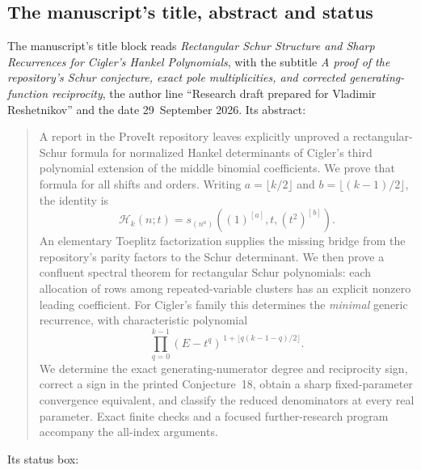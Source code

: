 \documentclass[11pt]{article}
\theoremstyle{definition}
\theoremstyle{remark}
\newcommand{\Ht}{\mathcal H}
\newcommand{\rep}[2]{(#1)^{[#2]}}
\theoremstyle{definition}
\theoremstyle{plain}
\numberwithin{equation}{section}
\begin{document}
\subsection{The manuscript's title, abstract and status}
\label{rs:sec:front}
The manuscript's title block reads \emph{Rectangular Schur Structure and
Sharp Recurrences for Cigler's Hankel Polynomials}, with the subtitle
\emph{A proof of the repository's Schur conjecture, exact pole
multiplicities, and corrected generating-function reciprocity}, the author
line ``Research draft prepared for Vladimir Reshetnikov'' and the date
29~September 2026. Its abstract:
\begin{quote}\small
A report in the ProveIt repository leaves explicitly unproved a rectangular-Schur
formula for normalized Hankel determinants of Cigler's third polynomial
extension of the middle binomial coefficients. We prove that formula for all
shifts and orders. Writing $a=\lfloor k/2\rfloor$ and
$b=\lfloor(k-1)/2\rfloor$, the identity is
\[
 \Ht_k(n;t)=s_{(n^a)}(\rep1a,t,\rep{t^2}b).
\]
An elementary Toeplitz factorization supplies the missing bridge from the
repository's parity factors to the Schur determinant. We then prove a
confluent spectral theorem for rectangular Schur polynomials: each allocation
of rows among repeated-variable clusters has an explicit nonzero leading
coefficient. For Cigler's family this determines the \emph{minimal} generic
recurrence, with characteristic polynomial
\[
 \prod_{q=0}^{k-1}(E-t^q)^{\,1+\lfloor q(k-1-q)/2\rfloor}.
\]
We determine the exact generating-numerator degree and reciprocity sign,
correct a sign in the printed Conjecture~18, obtain a sharp fixed-parameter
convergence equivalent, and classify the reduced denominators at every real
parameter. Exact finite checks and a focused further-research program
accompany the all-index arguments.
\end{quote}
Its status box:

\medskip
\noindent{}
\medskip
\end{document}
